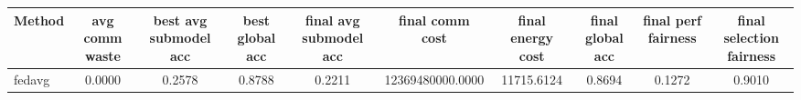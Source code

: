 \begin{tabular}{lccccccccc}
\toprule
Method & avg comm waste & best avg submodel acc & best global acc & final avg submodel acc & final comm cost & final energy cost & final global acc & final perf fairness & final selection fairness \\
\midrule
fedavg & 0.0000 & 0.2578 & 0.8788 & 0.2211 & 12369480000.0000 & 11715.6124 & 0.8694 & 0.1272 & 0.9010 \\
\bottomrule
\end{tabular}
